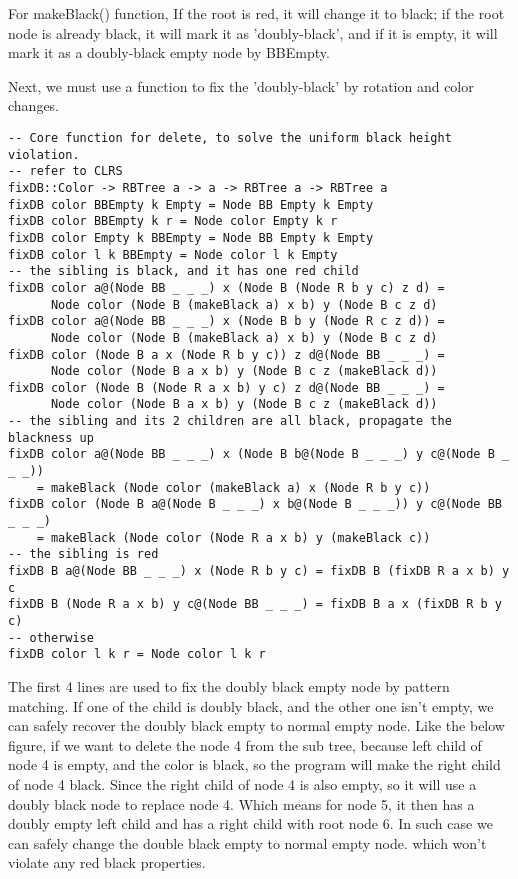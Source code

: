 \documentclass{article}
\begin{document}
For makeBlack() function, If the root is red, it will change it to black; if the root node is 
already black, it will mark it as 'doubly-black', and if it is empty, it will mark it as a 
doubly-black empty node by BBEmpty.

Next, we must use a function to fix the 'doubly-black' by rotation and color changes.

\begin{lstlisting}
-- Core function for delete, to solve the uniform black height violation.
-- refer to CLRS
fixDB::Color -> RBTree a -> a -> RBTree a -> RBTree a
fixDB color BBEmpty k Empty = Node BB Empty k Empty
fixDB color BBEmpty k r = Node color Empty k r
fixDB color Empty k BBEmpty = Node BB Empty k Empty
fixDB color l k BBEmpty = Node color l k Empty
-- the sibling is black, and it has one red child
fixDB color a@(Node BB _ _ _) x (Node B (Node R b y c) z d) = 
      Node color (Node B (makeBlack a) x b) y (Node B c z d)
fixDB color a@(Node BB _ _ _) x (Node B b y (Node R c z d)) = 
      Node color (Node B (makeBlack a) x b) y (Node B c z d)
fixDB color (Node B a x (Node R b y c)) z d@(Node BB _ _ _) = 
      Node color (Node B a x b) y (Node B c z (makeBlack d))
fixDB color (Node B (Node R a x b) y c) z d@(Node BB _ _ _) = 
      Node color (Node B a x b) y (Node B c z (makeBlack d))
-- the sibling and its 2 children are all black, propagate the blackness up
fixDB color a@(Node BB _ _ _) x (Node B b@(Node B _ _ _) y c@(Node B _ _ _))
    = makeBlack (Node color (makeBlack a) x (Node R b y c))
fixDB color (Node B a@(Node B _ _ _) x b@(Node B _ _ _)) y c@(Node BB _ _ _)
    = makeBlack (Node color (Node R a x b) y (makeBlack c))
-- the sibling is red
fixDB B a@(Node BB _ _ _) x (Node R b y c) = fixDB B (fixDB R a x b) y c
fixDB B (Node R a x b) y c@(Node BB _ _ _) = fixDB B a x (fixDB R b y c)
-- otherwise
fixDB color l k r = Node color l k r
\end{lstlisting}

The first 4 lines are used to fix the doubly black empty node by pattern matching.
If one of the child is doubly black, and the other one isn't empty, we can safely
recover the doubly black empty to normal empty node. Like the below figure, if we
want to delete the node 4 from the sub tree, because left child of node 4 is empty, 
and the color is black, so the program will make the right child of node 4 black.
Since the right child of node 4 is also empty, so it will use a doubly black node
to replace node 4. Which means for node 5, it then has a doubly empty left child
and has a right child with root node 6. In such case we can safely change the
double black empty to normal empty node. which won't violate any red black properties.
\end{document}
